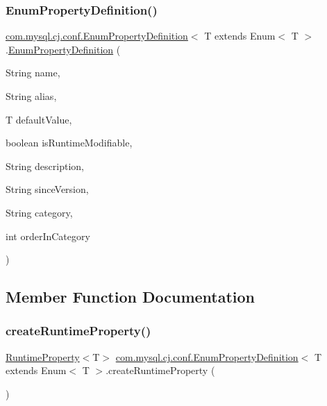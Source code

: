 \subsubsection{\texorpdfstring{Enum\+Property\+Definition()}{EnumPropertyDefinition()}}
{\footnotesize\ttfamily \mbox{\hyperlink{classcom_1_1mysql_1_1cj_1_1conf_1_1_enum_property_definition}{com.\+mysql.\+cj.\+conf.\+Enum\+Property\+Definition}}$<$ T extends Enum$<$ T $>$.\mbox{\hyperlink{classcom_1_1mysql_1_1cj_1_1conf_1_1_enum_property_definition}{Enum\+Property\+Definition}} (\begin{DoxyParamCaption}\item[{String}]{name,  }\item[{String}]{alias,  }\item[{T}]{default\+Value,  }\item[{boolean}]{is\+Runtime\+Modifiable,  }\item[{String}]{description,  }\item[{String}]{since\+Version,  }\item[{String}]{category,  }\item[{int}]{order\+In\+Category }\end{DoxyParamCaption})}



\subsection{Member Function Documentation}
\mbox{\label{classcom_1_1mysql_1_1cj_1_1conf_1_1_enum_property_definition_a463e1e063d6969ca3d352b31ea9324b5}} 
\subsubsection{\texorpdfstring{create\+Runtime\+Property()}{createRuntimeProperty()}}
{\footnotesize\ttfamily \mbox{\hyperlink{interfacecom_1_1mysql_1_1cj_1_1conf_1_1_runtime_property}{Runtime\+Property}}$<$T$>$ \mbox{\hyperlink{classcom_1_1mysql_1_1cj_1_1conf_1_1_enum_property_definition}{com.\+mysql.\+cj.\+conf.\+Enum\+Property\+Definition}}$<$ T extends Enum$<$ T $>$.create\+Runtime\+Property (\begin{DoxyParamCaption}{ }\end{DoxyParamCaption})}

